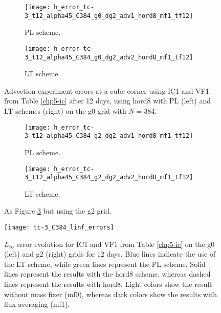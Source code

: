 \newpage
\begin{figure}[!htb]
	\centering
	\begin{subfigure}{0.45\textwidth}
		\centering
		\texttt{[image: h\_error\_tc-3\_t12\_alpha45\_C384\_g0\_dg2\_adv1\_hord8\_mf1\_tf12]}
		\caption{PL scheme.\label{chp-advcs-sec-exp-adv2-errors-0a}}
	\end{subfigure}
	\begin{subfigure}{0.45\textwidth}
		\centering
		\texttt{[image: h\_error\_tc-3\_t12\_alpha45\_C384\_g0\_dg2\_adv2\_hord8\_mf1\_tf12]}
		\caption{LT scheme.\label{chp-advcs-sec-exp-adv2-errors-0b}}
	\end{subfigure}
	\caption{
		Advection experiment errors at a cube corner using IC1 and VF1 from Table \ref{chp5-ic} after 12 days, using hord8
		with PL (left) and LT schemes (right) on the g0 grid with $N=384$. 
		\label{chp-advcs-sec-exp-adv2-errors-0}}
\end{figure}
\begin{figure}[!htb]
	\centering
	\begin{subfigure}{0.45\textwidth}
		\centering
		\texttt{[image: h\_error\_tc-3\_t12\_alpha45\_C384\_g2\_dg2\_adv1\_hord8\_mf1\_tf12]}
		\caption{PL scheme.\label{chp-advcs-sec-exp-adv2-errors-2a}}
	\end{subfigure}
	\begin{subfigure}{0.45\textwidth}
		\centering
		\texttt{[image: h\_error\_tc-3\_t12\_alpha45\_C384\_g2\_dg2\_adv2\_hord8\_mf1\_tf12]}
		\caption{LT scheme.\label{chp-advcs-sec-exp-adv2-errors-2b}}
	\end{subfigure}
	\caption{As Figure \ref{chp-advcs-sec-exp-adv2-errors-0} but using the g2 grid.\label{chp-advcs-sec-exp-adv2-errors-2}}
\end{figure}

\newpage
\begin{figure}[!htb]
		\centering
		\texttt{[image: tc-3\_C384\_linf\_errors]}
		\caption{
$L_{\infty}$ error evolution for IC1 and VF1 from Table \ref{chp5-ic} on the g0 (left) and g2 (right) grids for 12 days.
Blue lines indicate the use of the LT scheme, while green lines represent the PL scheme.
Solid lines represent the results with the hord8 scheme, whereas dashed lines represent the results with hord8.
Light colors show the result without mass fixer (mf0), whereas dark colors show the results with flux averaging (mf1).\label{chp-advcs-sec-exp-adv2-evol-linf}}
\end{figure}

